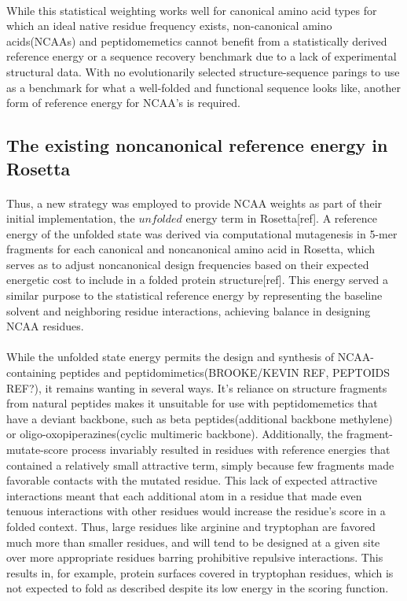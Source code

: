 \paragraph{}
While this statistical weighting works well for canonical amino acid types for which an ideal native residue frequency exists, non-canonical amino acids(NCAAs) and peptidomemetics cannot benefit from a statistically derived reference energy or a sequence recovery benchmark due to a lack of experimental structural data. With no evolutionarily selected structure-sequence parings to use as a benchmark for what a well-folded and functional sequence looks like, another form of reference energy for NCAA's is required.

\subsection{The existing noncanonical reference energy in Rosetta}

\paragraph{}
Thus, a new strategy was employed to provide NCAA weights as part of their initial implementation, the $unfolded$ energy term in Rosetta[ref].
A reference energy of the unfolded state was derived via computational mutagenesis in 5-mer fragments for each canonical and noncanonical amino acid in Rosetta, which serves as to adjust noncanonical design frequencies based on their expected energetic cost to include in a folded protein structure[ref].
This energy served a similar purpose to the statistical reference energy by representing the baseline solvent and neighboring residue interactions, achieving balance in designing NCAA residues.

\paragraph{}
While the unfolded state energy permits the design and synthesis of NCAA-containing peptides and peptidomimetics(BROOKE/KEVIN REF, PEPTOIDS REF?), it remains wanting in several ways.
It's reliance on structure fragments from natural peptides makes it unsuitable for use with peptidomemetics that have a deviant backbone, such as beta peptides(additional backbone methylene) or oligo-oxopiperazines(cyclic multimeric backbone).
Additionally, the fragment-mutate-score process invariably resulted in residues with reference energies that contained a relatively small attractive term, simply because few fragments made favorable contacts with the mutated residue.
This lack of expected attractive interactions meant that each additional atom in a residue that made even tenuous interactions with other residues would increase the residue's score in a folded context.
Thus, large residues like arginine and tryptophan are favored much more than smaller residues, and will tend to be designed at a given site over more appropriate residues barring prohibitive repulsive interactions.
This results in, for example, protein surfaces covered in tryptophan residues, which is not expected to fold as described despite its low energy in the scoring function.

